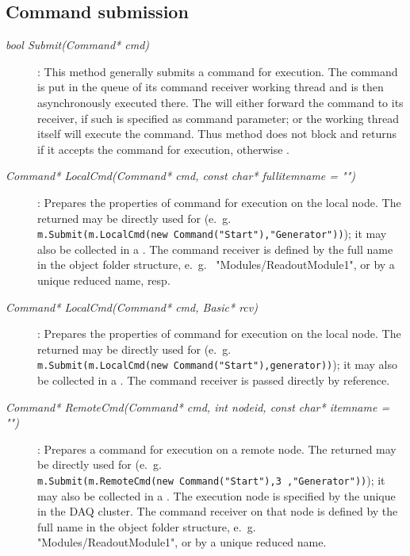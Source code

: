 \subsection{Command submission}	 
\label{prog_manager_framework_commands}	
\begin{description}
 
\item[\em bool Submit\small (Command* cmd)] :
This method generally submits a command  for execution.
The command is put in the queue of its command receiver working thread and is
then asynchronously executed there. The  will either forward the command
to its receiver, if such is specified as command parameter; or the  working thread itself will execute the command.
Thus method does not block and returns  if it accepts the command for execution, otherwise . 
      
\item[\em Command* LocalCmd\small (Command* cmd, const char* fullitemname = "")] :
Prepares the properties of command  for execution on the local node. The
returned  may be directly used for 
(e.~g.~ \\ {\tt m.Submit(m.LocalCmd(new Command("Start"),"Generator"))});
it may also be collected in a .
The command receiver is defined by the full name  in the object folder structure, e.~g.~ "Modules/ReadoutModule1", or by a unique reduced name, resp.

\item[\em Command* LocalCmd\small (Command* cmd, Basic* rcv)] :
Prepares the properties of command  for execution on the local node. The
returned  may be directly used for 
(e.~g.~ \\ {\tt m.Submit(m.LocalCmd(new Command("Start"),generator))});
it may also be collected in a .
The command receiver  is passed directly by reference.


\item[\em Command* RemoteCmd(Command* cmd, int nodeid, const char* itemname = "")] :
Prepares a command  for execution on a remote node. 
The returned  may be directly used for 
(e.~g.~ \\ {\tt m.Submit(m.RemoteCmd(new Command("Start"),3 ,"Generator"))});
it may also be collected in a .
The execution node is specified by the unique  in the DAQ
cluster. The command receiver on that node
is defined by the full name  in the object folder structure,
e.~g.~ "Modules/ReadoutModule1", or by a unique reduced name.



\end{description}
